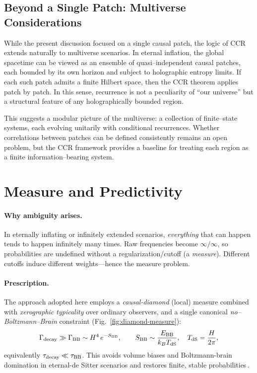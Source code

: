\documentclass[12pt]{article}
\theoremstyle{remark}
\begin{document}
\subsection*{Beyond a Single Patch: Multiverse Considerations}

While the present discussion focused on a single causal patch, the logic of CCR 
extends naturally to multiverse scenarios. In eternal inflation, the global spacetime 
can be viewed as an ensemble of quasi--independent causal patches, each bounded by 
its own horizon and subject to holographic entropy limits. If each such patch admits 
a finite Hilbert space, then the CCR theorem applies patch by patch. In this sense, 
recurrence is not a peculiarity of ``our universe'' but a structural feature of any 
holographically bounded region.

This suggests a modular picture of the multiverse: a collection of finite--state 
systems, each evolving unitarily with conditional recurrences. Whether correlations 
between patches can be defined consistently remains an open problem, but the CCR 
framework provides a baseline for treating each region as a finite information--bearing 
system.



\section{Measure and Predictivity}\label{sec:measure}
\paragraph{Why ambiguity arises.} In eternally inflating or infinitely extended scenarios, \emph{everything} that can happen tends to happen infinitely many times. Raw frequencies become $\infty/\infty$, so probabilities are undefined without a regularization/cutoff (a \emph{measure}). Different cutoffs induce different weights---hence the measure problem.

\paragraph{Prescription.} The approach adopted here employs a \emph{causal-diamond} (local) measure combined with \emph{xerographic typicality} over ordinary observers, and a single canonical \emph{no--Boltzmann--Brain} constraint (Fig.~\ref{fig:diamond-measure}):
\begin{equation}
 \Gamma_{\rm decay} \gg \Gamma_{\rm BB} \sim H^4\,e^{-S_{\rm BB}},\qquad 
 S_{\rm BB}\sim \frac{E_{\rm BB}}{k_B T_{\rm dS}},\quad T_{\rm dS}=\frac{H}{2\pi},
\end{equation}
equivalently $\tau_{\rm decay}\ll \tau_{\rm BB}$. This avoids volume biases and Boltzmann-brain domination in eternal-de Sitter scenarios and restores finite, stable probabilities\,\cite{DysonKlebanSusskind2002,Page2007}.
\end{document}
